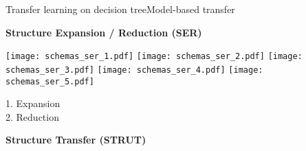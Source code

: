 \begin{frame}{Transfer learning on decision tree}{Model-based transfer}

\centering\citet{segev2017learn}

\begin{minipage}[t]{0.49\linewidth}
    \vspace{0pt}
    \centering
    \textbf{Structure Expansion / Reduction (SER)}
    
    \renewcommand{\ratio}{0.55}
    \begin{overprint}
        \centering\texttt{[image: schemas\_ser\_1.pdf]}
        \centering\texttt{[image: schemas\_ser\_2.pdf]}
        \centering\texttt{[image: schemas\_ser\_3.pdf]}
        \centering\texttt{[image: schemas\_ser\_4.pdf]}
        \centering\texttt{[image: schemas\_ser\_5.pdf]}
    \end{overprint}
    
    \pause \pause
    \textcolor{myblue}{1. Expansion}\\
    \pause
    \textcolor{myorange}{2. Reduction}\\
    \bigskip

\end{minipage}\hfill
\begin{minipage}[t]{0.49\linewidth}
    \vspace{0pt}
    \centering
    \pause \pause
    \textbf{Structure Transfer (STRUT)}
    

\end{minipage}
\end{frame}
